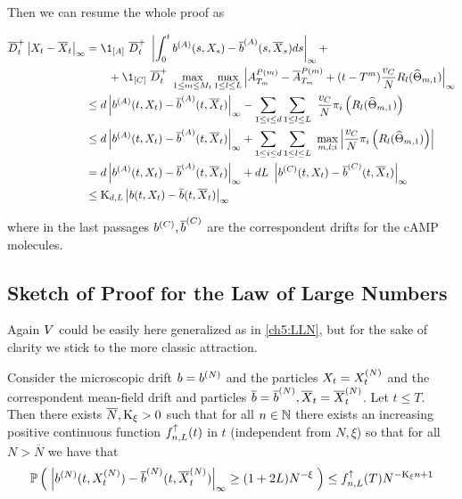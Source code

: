 Then we can resume the whole proof as

\begin{align*}
	\diniu_t^+
	\norm{\sol_t-\mfsol_t}_\infty 
	&=
	\1_{[\amba]}\
	\diniu_t^+\
	\norm{
		\int_0^t \drift^{(A)}(s, \sol_s) - \mfdrift^{(\amba)}(s, \mfsol_s) ds
	}_\infty + 
	\\
	&\qquad
	+ 
	\1_{[\camp]}\
	\diniu_t^+\
	\max_{1\leq m \leq \hmactive_t}	
	\max_{1\leq l \leq \NumCampRelease}
	\norm{
		\amba_{\btime_{m}}^{\Parentof(m)} 
		- \mfamba_{\btime_{m}}^{\Parentof(m)}
		+ (t - \btime^{m}) \frac{\cdrift}{N}  \rotation_l (\cgonia_{m,1})
	}_\infty
	\\
	&\leq
	d \norm{
		\drift^{(\amba)}(t, \sol_t) - \mfdrift^{(\amba)}(t, \mfsol_t)
	}_\infty 
	-
	\sum_{1\leq i \leq d}
	\sum_{1\leq l \leq \NumCampRelease}\
	\frac{\cdrift}{N}  \pi_i \left(\rotation_l (\cgonia_{m,1}) \right)
	\\
	&\leq
	d \norm{
		\drift^{(A)}(t, \sol_t) - \mfdrift^{(\amba)}(t, \mfsol_t)
	}_\infty 
	+
	\sum_{1\leq i \leq d}
	\sum_{1\leq l \leq \NumCampRelease}\
	\max_{m,l;i}
	\norm{
		\frac{\cdrift}{N}  \pi_i \left(\rotation_l (\cgonia_{m,1}) \right)
	}
	\\
	&=
	d \norm{
		\drift^{(\amba)}(t, \sol_t) - \mfdrift^{(\amba)}(t, \mfsol_t)
	}_\infty 
	+
	d\NumCampRelease\
	\norm{
		\drift^{(\camp)}(t, \sol_t) - \mfdrift^{(\camp)}(t, \mfsol_t)
	}_\infty
	\\
	&\leq
	\const_{d, \NumCampRelease} \norm{
		\drift(t, \sol_t) - \mfdrift(t, \mfsol_t)
	}_\infty
\end{align*}

where in the last passages $b^{(C)},\overline{b}^{(C)}$ are the correspondent drifts for the cAMP molecules.

\subsection{Sketch of Proof for the Law of Large Numbers}

Again $V$ could be easily here generalized as in \ref{ch5:LLN}, but for the sake of clarity we stick to the more classic attraction.

\begin{proposition}
	
	\label{ch7:LLN}
 	Consider the microscopic drift $b = b^{(N)}$ and the particles $X_t = X_t^{(N)}$ and the correspondent mean-field drift and particles $\overline{b} = \overline{b}^{(N)}, \overline{X}_t=\overline{X}_t^{(N)}$. 
 	Let $t\leq T$.
 	Then there exists $\overline{N},\text{K}_\xi >0$ such that for all  $n\in \mathbb{N}$ there exists an increasing positive continuous function $f^\uparrow_{n, L}(t)$ in $t$ (independent from $N,\xi$) so that for all $N > \overline{N}$ we have that
 	\begin{equation*}
 		\mathbb{P} \left( \; 
 			\left| 
 				b^{(N)}(t, X_t^{(N)}) - \overline{b}^{(N)}(t, \overline{X}_t^{(N)})
 			 \right|_\infty
 			\geq
 			(1+2L)N^{-\xi}
 		 \; \right)
 		\leq
 		f^\uparrow_{n, L}(T)
 		N^{-\text{K}_\xi n +1}
 	\end{equation*}
\end{proposition}

